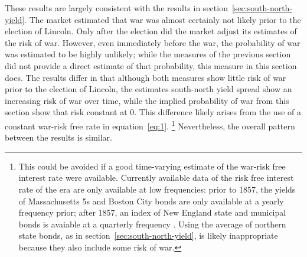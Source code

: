 \documentclass[11pt, oneside, article]{memoir}\usepackage[]{graphicx}\usepackage[]{color}
\begin{document}
These results are largely consistent with the results in section~\ref{sec:south-north-yield}.
The market estimated that war was almost certainly not likely prior to the election of Lincoln.
Only after the election did the market adjust its estimates of the risk of war.
However, even immediately before the war, the probability of war was estimated to be highly unlikely; while the measures of the previous section did not provide a direct estimate of that probability, this measure in this section does.
The results differ in that although both measures show little risk of war prior to the election of Lincoln, the estimates south-north yield spread show an increasing risk of war over time, while the implied probability of war from this section show that risk constant at 0.
This difference likely arises from the use of a constant war-risk free rate in equation~\eqref{eq:1}.%
\footnote{This could be avoided if a good time-varying estimate of the war-risk free interest rate were available.
  Currently available data of the risk free interest rate of the era are only available at low frequencies: prior to 1857, the yields of Massachusetts 5s and Boston City bonds are only available at a yearly frequency prior; after 1857, an index of New England state and municipal bonds is avaiable at a quarterly frequency \parencite{Officer2003}.
  Using the average of northern state bonds, as in section~\ref{sec:south-north-yield}, is likely inappropriate because they also include some risk of war.
}
Nevertheless, the overall pattern between the results is similar.
\end{document}
